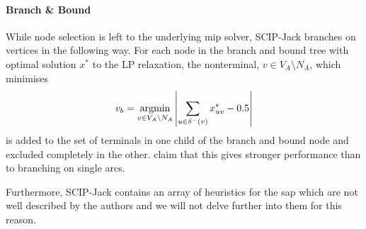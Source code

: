   \paragraph{Branch \& Bound}
  While node selection is left to the underlying \gls{mip} solver, SCIP-Jack branches on vertices in the following way. For each node in the
  branch and bound tree with optimal solution $x^*$ to the LP relaxation, the nonterminal, $v \in V_A \setminus N_A$, which minimises
  \[v_b = \operatorname*{argmin}_{v \in V_A \setminus N_A} \left| \sum_{u \in \delta^-(v)} x^*_{uv} - 0.5 \right|\]
  is added to the set of terminals in one child of the branch and bound node and excluded completely in the other.
  \citet{gamrath2017scip} claim that this gives stronger performance than
  to branching on single arcs.

  Furthermore, SCIP-Jack contains an array of heuristics for the \gls{sap} which are not well described
  by the authors and we will not delve further into them for this reason.


